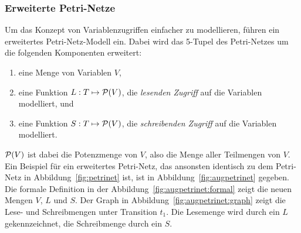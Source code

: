 \subsubsection{Erweiterte Petri-Netze}
Um das Konzept von Variablenzugriffen einfacher zu modellieren, führen \textcite{Goel1990} ein erweitertes Petri-Netz-Modell ein. Dabei wird das 5-Tupel des Petri-Netzes um die folgenden Komponenten erweitert:
\begin{enumerate}
	\item eine Menge von Variablen $V$,
	\item eine Funktion $L: T \mapsto \mathcal{P}(V)$, die \emph{lesenden Zugriff} auf die Variablen modelliert, und
	\item eine Funktion $S: T \mapsto \mathcal{P}(V)$, die \emph{schreibenden Zugriff} auf die Variablen modelliert.
\end{enumerate}
$\mathcal{P}(V)$ ist dabei die Potenzmenge von $V$, also die Menge aller Teilmengen von $V$.
Ein Beispiel für ein erweitertes Petri-Netz, das ansonsten identisch zu dem Petri-Netz in Abbildung~\ref{fig:petrinet} ist, ist in Abbildung~\ref{fig:augpetrinet} gegeben. Die formale Definition in der Abbildung~\ref{fig:augpetrinet:formal} zeigt die neuen Mengen $V$, $L$ und $S$. Der Graph in Abbildung~\ref{fig:augpetrinet:graph} zeigt die Lese- und Schreibmengen unter Transition $t_1$. Die Lesemenge wird durch ein $L$ gekennzeichnet, die Schreibmenge durch ein $S$. 
